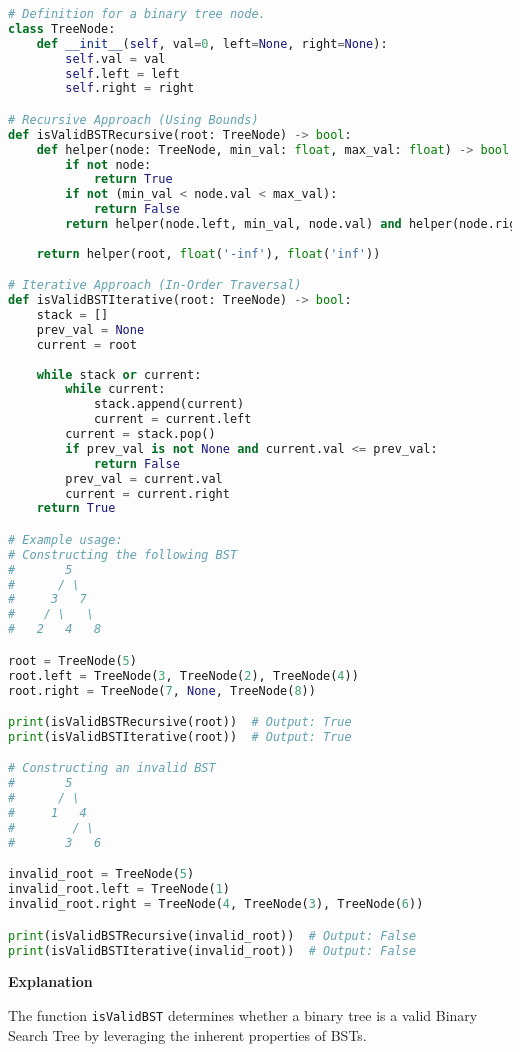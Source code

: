 \begin{lstlisting}[language=Python, xleftmargin=0.02\textwidth, xrightmargin=0.02\textwidth]
# Definition for a binary tree node.
class TreeNode:
    def __init__(self, val=0, left=None, right=None):
        self.val = val
        self.left = left
        self.right = right

# Recursive Approach (Using Bounds)
def isValidBSTRecursive(root: TreeNode) -> bool:
    def helper(node: TreeNode, min_val: float, max_val: float) -> bool:
        if not node:
            return True
        if not (min_val < node.val < max_val):
            return False
        return helper(node.left, min_val, node.val) and helper(node.right, node.val, max_val)
    
    return helper(root, float('-inf'), float('inf'))

# Iterative Approach (In-Order Traversal)
def isValidBSTIterative(root: TreeNode) -> bool:
    stack = []
    prev_val = None
    current = root
    
    while stack or current:
        while current:
            stack.append(current)
            current = current.left
        current = stack.pop()
        if prev_val is not None and current.val <= prev_val:
            return False
        prev_val = current.val
        current = current.right
    return True

# Example usage:
# Constructing the following BST
#       5
#      / \
#     3   7
#    / \   \
#   2   4   8

root = TreeNode(5)
root.left = TreeNode(3, TreeNode(2), TreeNode(4))
root.right = TreeNode(7, None, TreeNode(8))

print(isValidBSTRecursive(root))  # Output: True
print(isValidBSTIterative(root))  # Output: True

# Constructing an invalid BST
#       5
#      / \
#     1   4
#        / \
#       3   6

invalid_root = TreeNode(5)
invalid_root.left = TreeNode(1)
invalid_root.right = TreeNode(4, TreeNode(3), TreeNode(6))

print(isValidBSTRecursive(invalid_root))  # Output: False
print(isValidBSTIterative(invalid_root))  # Output: False
\end{lstlisting}

\textbf{Explanation}

The function \texttt{isValidBST} determines whether a binary tree is a valid Binary Search Tree by leveraging the inherent properties of BSTs. 

